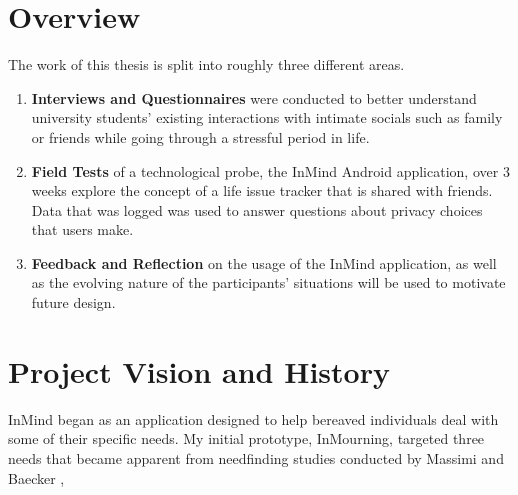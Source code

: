 \section{Overview}
  The work of this thesis is split into roughly three different areas.
  \begin{enumerate}
  \item \textbf{Interviews and Questionnaires} were conducted to better understand
    university students' existing interactions with intimate socials
    such as family or friends while going through a stressful period in life.
  \item \textbf{Field Tests} of a technological probe, the InMind Android application,
    over 3 weeks
    explore the concept of a life issue tracker that is shared with friends.
    Data that was logged was used to answer questions about privacy choices that users make.
  \item \textbf{Feedback and Reflection} on the usage of the InMind application,
    as well as the evolving nature of the participants' situations will
    be used to motivate future design.
  \end{enumerate}

\section{Project Vision and History}
\label{sec:vision}
  InMind began as an application designed to help bereaved individuals deal with
  some of their specific needs.
  My initial prototype, InMourning, targeted three needs that became apparent
  from needfinding studies conducted by Massimi and
  Baecker \cite{mm11a, mm10, mm13},


